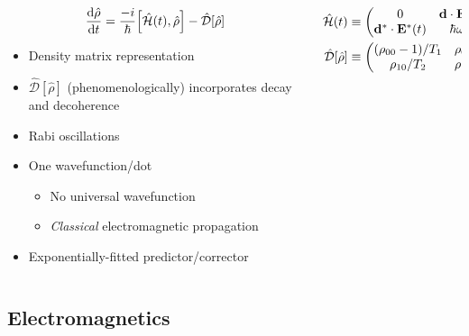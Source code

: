\documentclass[aspectratio=169]{beamer}
\begin{document}
\begin{frame}
  \begin{columns}
    \begin{column}{0.5\textwidth}
        \begin{equation*}
          \dv{\hat{\rho}}{t} = \frac{-i}{\hbar} \commutator{\hat{\mathcal{H}}(t)}{\hat{\rho}} - \hat{\mathcal{D}}\qty[\hat{\rho}]
        \end{equation*}
        \begin{itemize}
          \item Density matrix representation
          \item $\hat{\mathcal{D}}[\hat{\rho}]$ (phenomenologically) incorporates decay and decoherence
          \item Rabi oscillations
          \item One wavefunction/dot
            \begin{itemize}
              \item No universal wavefunction
              \item \emph{Classical} electromagnetic propagation
            \end{itemize}
          \item Exponentially-fitted predictor/corrector
        \end{itemize}
    \end{column}
    \begin{column}{0.5\textwidth}
      
      \begin{align*}
        \hat{\mathcal{H}}(t) &\equiv \mqty(0 & \vb{d} \cdot \vb{E}(t) \\ \vb{d}^* \cdot \vb{E}^*(t) & \hbar \omega_0) \\
        \hat{\mathcal{D}}[\hat{\rho}] &\equiv \mqty( (\rho_{00} - 1)/T_1 & \rho_{01}/T_2 \\ \rho_{10}/T_2 & \rho_{11}/T_1)
      \end{align*}
    \end{column}
  \end{columns}
\end{frame}

\subsection{Electromagnetics}
\end{document}
